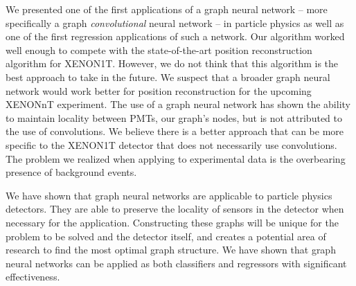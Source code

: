 \documentclass[thesis.tex]{subfiles}
\begin{document}
We presented one of the first applications of a graph neural network -- more specifically a graph \textit{convolutional} neural network -- in particle physics as well as one of the first regression applications of such a network.
Our algorithm worked well enough to compete with the state-of-the-art position reconstruction algorithm for XENON1T.
However, we do not think that this algorithm is the best approach to take in the future.
We suspect that a broader graph neural network would work better for position reconstruction for the upcoming XENONnT experiment.
The use of a graph neural network has shown the ability to maintain locality between PMTs, our graph's nodes, but is not attributed to the use of convolutions.
We believe there is a better approach that can be more specific to the XENON1T detector that does not necessarily use convolutions.
The problem we realized when applying to experimental data is the overbearing presence of background events.

\par We have shown that graph neural networks are applicable to particle physics detectors.
They are able to preserve the locality of sensors in the detector when necessary for the application.
Constructing these graphs will be unique for the problem to be solved and the detector itself, and creates a potential area of research to find the most optimal graph structure.
We have shown that graph neural networks can be applied as both classifiers and regressors with significant effectiveness.
\end{document}
